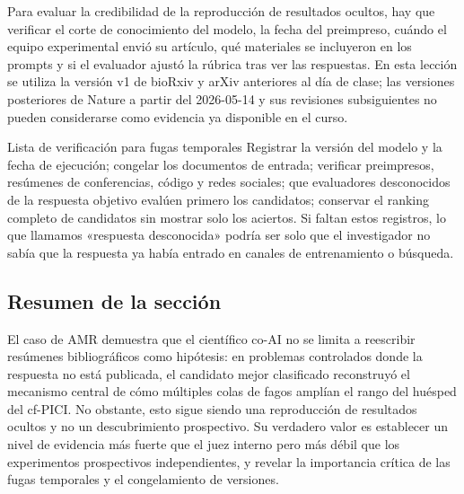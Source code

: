 Para evaluar la credibilidad de la reproducción de resultados ocultos, hay que verificar el corte de conocimiento del modelo, la fecha del preimpreso, cuándo el equipo experimental envió su artículo, qué materiales se incluyeron en los prompts y si el evaluador ajustó la rúbrica tras ver las respuestas. En esta lección se utiliza la versión v1 de bioRxiv y arXiv anteriores al día de clase; las versiones posteriores de Nature a partir del 2026-05-14 y sus revisiones subsiguientes no pueden considerarse como evidencia ya disponible en el curso.

\begin{warningbox}{Lista de verificación para fugas temporales}
Registrar la versión del modelo y la fecha de ejecución; congelar los documentos de entrada; verificar preimpresos, resúmenes de conferencias, código y redes sociales; que evaluadores desconocidos de la respuesta objetivo evalúen primero los candidatos; conservar el ranking completo de candidatos sin mostrar solo los aciertos. Si faltan estos registros, lo que llamamos «respuesta desconocida» podría ser solo que el investigador no sabía que la respuesta ya había entrado en canales de entrenamiento o búsqueda.
\end{warningbox}

\subsection{Resumen de la sección}

El caso de AMR demuestra que el científico co-AI no se limita a reescribir resúmenes bibliográficos como hipótesis: en problemas controlados donde la respuesta no está publicada, el candidato mejor clasificado reconstruyó el mecanismo central de cómo múltiples colas de fagos amplían el rango del huésped del cf-PICI. No obstante, esto sigue siendo una reproducción de resultados ocultos y no un descubrimiento prospectivo. Su verdadero valor es establecer un nivel de evidencia más fuerte que el juez interno pero más débil que los experimentos prospectivos independientes, y revelar la importancia crítica de las fugas temporales y el congelamiento de versiones.
